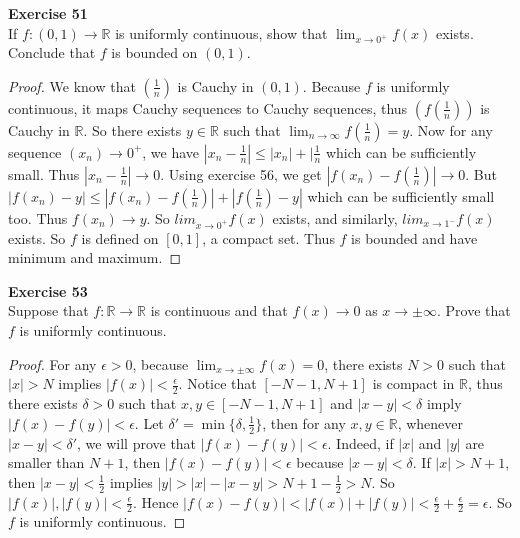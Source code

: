 \documentclass[12pt, a4paper]{article}
\theoremstyle{plain}
\newcommand{\R}{\mathbb{R}}
\newenvironment{exercise}[2][Exercise]
    { \begin{mdframed}[backgroundcolor=gray!20] \textbf{#1 #2} \\}
    {  \end{mdframed}}
\begin{document}
\begin{exercise}{51}
If $f:(0,1)\rightarrow \R$ is uniformly continuous, show that $\lim_{x\rightarrow 0^+}f(x)$ exists. Conclude that $f$ is bounded on $(0,1)$.
\end{exercise}
	\begin{proof}
	We know that $(\frac{1}{n})$ is Cauchy in $(0,1)$. Because $f$ is uniformly continuous, it maps Cauchy sequences to Cauchy sequences, thus $(f(\frac{1}{n}))$ is Cauchy in $\R$. So there exists $y\in \R$ such that $\lim_{n\rightarrow\infty} f(\frac{1}{n})=y$. Now for any sequence $(x_n)\rightarrow 0^+$, we have $|x_n-\frac{1}{n}|\leq |x_n|+|\frac{1}{n}$ which can be sufficiently small. Thus $|x_n-\frac{1}{n}|\rightarrow 0$. Using exercise 56, we get $|f(x_n)-f(\frac{1}{n})|\rightarrow 0$. But $|f(x_n)-y|\leq  |f(x_n)-f(\frac{1}{n})|+|f(\frac{1}{n})-y|$ which can be sufficiently small too. Thus $f(x_n)\rightarrow y$. So $lim_{x\rightarrow 0^+}f(x)$ exists, and similarly, $lim_{x\rightarrow 1^-}f(x)$ exists. So $f$ is defined on $[0,1]$, a compact set. Thus $f$ is bounded and have minimum and maximum.
	\end{proof}

\begin{exercise}{53}
Suppose that $f:\R\rightarrow \R$ is continuous and that $f(x)\rightarrow 0$ as $x\rightarrow\pm\infty$. Prove that $f$ is uniformly continuous.
\end{exercise}
	\begin{proof}
	For any $\epsilon>0$, because $\lim_{x\rightarrow \pm\infty}f(x)=0$, there exists $N>0$ such that $|x|>N$ implies $|f(x)|<\frac{\epsilon}{2}$. Notice that $[-N-1,N+1]$ is compact in $\R$, thus there exists $\delta>0$ such that $x,y\in [-N-1,N+1]$ and $|x-y|<\delta$ imply $|f(x)-f(y)|<\epsilon$. Let $\delta'=\min\{\delta,\frac{1}{2}\}$, then for any $x,y\in\R$, whenever $|x-y|<\delta'$, we will prove that $|f(x)-f(y)|<\epsilon$. Indeed, if $|x|$ and $|y|$ are smaller than $N+1$, then $|f(x)-f(y)|<\epsilon$ because $|x-y|<\delta$. If $|x|>N+1$, then $|x-y|<\frac{1}{2}$ implies $|y|>|x|-|x-y|>N+1-\frac{1}{2}>N$. So $|f(x)|,|f(y)|<\frac{\epsilon}{2}$. Hence $|f(x)-f(y)|<|f(x)|+|f(y)|<\frac{\epsilon}{2}+\frac{\epsilon}{2}=\epsilon$. So $f$ is uniformly continuous.
	\end{proof}
	
\end{document}
